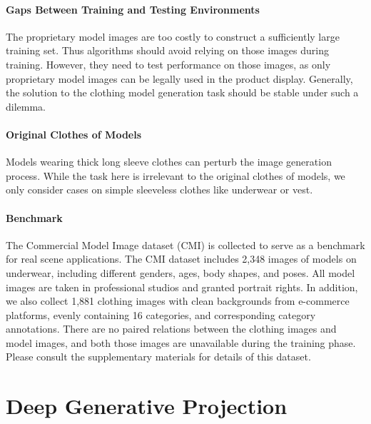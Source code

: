 \documentclass[10pt,twocolumn,letterpaper]{article}
\begin{document}
\paragraph{Gaps Between Training and Testing Environments} The proprietary model images are too costly to construct a sufficiently large training set. Thus algorithms should avoid relying on those images during training. However, they need to test performance on those images, as only proprietary model images can be legally used in the product display. Generally, the solution to the clothing model generation task should be stable under such a dilemma.

\paragraph{Original Clothes of Models} Models wearing thick long sleeve clothes can perturb the image generation process. While the task here is irrelevant to the original clothes of models, we only consider cases on simple sleeveless clothes like underwear or vest.

\paragraph{Benchmark} The Commercial Model Image dataset (CMI) is collected to serve as a benchmark for real scene applications. The CMI dataset includes 2,348 images of models on underwear, including different genders, ages, body shapes, and poses. All model images are taken in professional studios and granted portrait rights.
In addition, we also collect 1,881 clothing images with clean backgrounds from e-commerce platforms, evenly containing 16 categories, and corresponding category annotations. There are no paired relations between the clothing images and model images, and both those images are unavailable during the training phase. Please consult the supplementary materials for details of this dataset.

\section{Deep Generative Projection}
\end{document}
